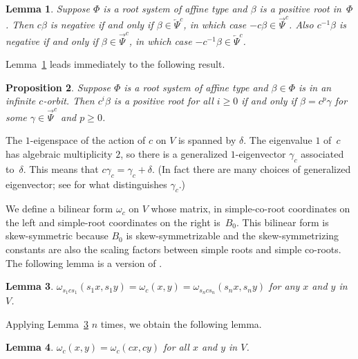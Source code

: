 \documentclass{amsart}
\newtheorem{proposition}{Proposition}[section]
\newtheorem{lemma}[proposition]{Lemma}
\theoremstyle{definition}
\theoremstyle{remark}
\numberwithin{equation}{section}
\newcommand{\0}{{\mathbf{0}}}
\newcommand{\RSChar}{\Phi}
\newcommand{\RS}{\RSChar}
\newcommand{\TravInfChar}{\Psi}
\newcommand{\TravProj}[1]{\overrightarrow{\TravInfChar}^{#1}}
\newcommand{\TravInj}[1]{\overleftarrow{\TravInfChar}^{#1}}
\begin{document}
\begin{lemma}\label{c to pos}
Suppose $\RS$ is a root system of affine type and $\beta$ is a positive root in~$\RS$. 
Then $c\beta$ is negative if and only if $\beta\in\TravInj{c}$, in which case $-c\beta\in\TravProj{c}$.
Also $c^{-1}\beta$ is negative if and only if $\beta\in\TravProj{c}$, in which case $-c^{-1}\beta\in\TravInj{c}$.
\end{lemma}

Lemma~\ref{c to pos} leads immediately to the following result.
\begin{proposition}\label{who is pos}
Suppose $\RS$ is a root system of affine type and $\beta\in\RS$ is in an infinite $c$-orbit.
Then $c^i\beta$ is a positive root for all $i\ge0$ if and only if $\beta=c^p\gamma$ for some $\gamma\in\TravProj{c}$ and $p\ge0$.
\end{proposition}

The $1$-eigenspace of the action of $c$ on $V$ is spanned by $\delta$.
The eigenvalue $1$ of~$c$ has algebraic multiplicity $2$, so there is a generalized $1$-eigenvector $\gamma_c$ associated to~$\delta$.
This means that $c\gamma_c=\gamma_c+\delta$.
(In fact there are many choices of generalized eigenvector; see \cite[Proposition~3.1]{afforb} for what distinguishes $\gamma_c$.)

We define a bilinear form $\omega_c$ on $V$ whose matrix, in simple-co-root coordinates on the left and simple-root coordinates on the right is~$B_0$.
This bilinear form is skew-symmetric because $B_0$ is skew-symmetrizable and the skew-symmetrizing constants are also the scaling factors between simple roots and simple co-roots.
The following lemma is a version of \cite[Lemma~3.8]{typefree}.

\begin{lemma}\label{omega s}
$\omega_{s_1cs_1}(s_1x,s_1y)=\omega_c(x,y)=\omega_{s_ncs_n}(s_nx,s_ny)$ for any $x$ and $y$ in~$V$.
\end{lemma}

Applying Lemma~\ref{omega s} $n$ times, we obtain the following lemma.

\begin{lemma}\label{omega c}
$\omega_c(x,y)=\omega_c(cx,cy)$ for all $x$ and $y$ in $V$.
\end{lemma}
\end{document}
